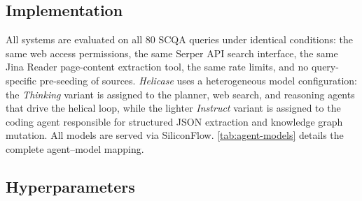 \documentclass{article}
\begin{document}
\subsection{Implementation}

All systems are evaluated on all 80 SCQA queries under identical conditions: the same web access permissions, the same Serper API search interface, the same Jina Reader page-content extraction tool, the same rate limits, and no query-specific pre-seeding of sources. \textit{Helicase} uses a heterogeneous model configuration: the \textit{Thinking} variant is assigned to the planner, web search, and reasoning agents that drive the helical loop, while the lighter \textit{Instruct} variant is assigned to the coding agent responsible for structured JSON extraction and knowledge graph mutation. All models are served via SiliconFlow. \autoref{tab:agent-models} details the complete agent--model mapping.

\begin{table}[t]
\centering
\caption{Helicase agent roles and their assigned LLM models. Thinking models, which support extended reasoning, are used for planning, web search, and cross-source reasoning; the lighter Instruct variant is used for structured JSON extraction onto the knowledge graph. The same Thinking model also serves as the LLM-based consensus scorer that computes action-layer uncertainty across worker-agent outputs.}
\label{tab:agent-models}
\end{table}

\subsection{Hyperparameters}
\end{document}
